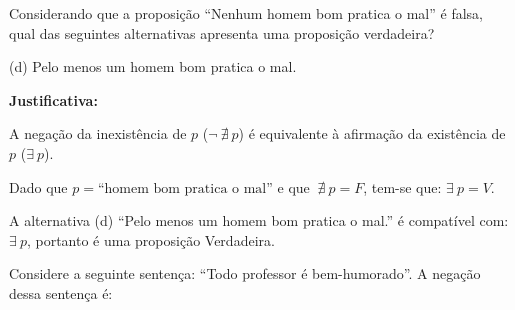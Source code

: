 \documentclass[12pt,letterpaper, onecolumn]{exam}
\begin{document}
\begin{questions}

    \question[q1] Considerando que a proposição “Nenhum homem bom pratica o mal” é falsa, qual das seguintes alternativas apresenta uma proposição verdadeira?
    
    
    \begin{solution}
        (d) Pelo menos um homem bom pratica o mal.

        \textbf{Justificativa:}
        
        A negação da inexistência de \(p\) (\( \neg \ \nexists \ p \)) é equivalente à afirmação da existência de \(p\) (\( \exists \ p \)).

        Dado que \(p = \text{“homem bom pratica o mal”} \) e que \( \ \nexists \ p = F\), tem-se que: \( \exists \ p  = V\).

        A alternativa (d) “Pelo menos um homem bom pratica o mal.” é compatível com: \(\exists \ p\), portanto é uma proposição Verdadeira. 
        
    \end{solution}
    
    \question[q2] Considere a seguinte sentença: “Todo professor é bem-humorado”. A negação dessa sentença é:
    
    \begin{parts}

\end{parts}
\end{questions}
\end{document}
